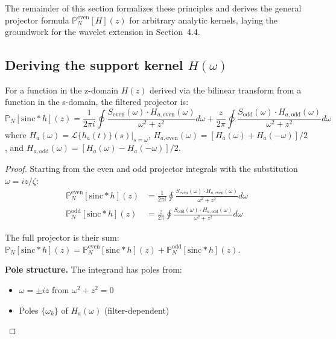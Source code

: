 The remainder of this section formalizes these principles and derives the general projector formula $\mathbb{P}_N^{\text{even}}[H](z)$ for arbitrary analytic kernels, laying the groundwork for the wavelet extension in Section~4.4.

\newcommand{\PP}{\mathbb{P}}
\newcommand{\odd}{\mathrm{odd}}
\newcommand{\even}{\mathrm{even}}

\subsection{Deriving the support kernel $\hat{H(\omega)}$}

\begin{theorem}
For a function in the z-domain $H(z)$ derived via the bilinear transform from a function in the s-domain, the filtered projector is:
\[
\mathbb{P}_N[\text{sinc} * h](z) = \frac{1}{2\pi i}\oint \frac{S_{\text{even}}(\omega) \cdot H_{a,\text{even}}(\omega)}{\omega^2+z^2} d\omega + \frac{z}{2\pi}\oint \frac{S_{\text{odd}}(\omega) \cdot H_{a,\text{odd}}(\omega)}{\omega^2+z^2} d\omega
\]
where $H_a(\omega) = \mathcal{L}\{h_a(t)\}(s)\big|_{s=\omega}$, $H_{a,\text{even}}(\omega) = [H_a(\omega) + H_a(-\omega)]/2$, and $H_{a,\text{odd}}(\omega) = [H_a(\omega) - H_a(-\omega)]/2$.

\begin{proof}
Starting from the even and odd projector integrals with the substitution $\omega = iz/\zeta$:
\begin{align*}
\mathbb{P}_N^{\text{even}}[\text{sinc} * h](z) &= \frac{1}{2\pi i}\oint \frac{S_{\text{even}}(\omega) \cdot H_{a,\text{even}}(\omega)}{\omega^2+z^2} d\omega\\
\mathbb{P}_N^{\text{odd}}[\text{sinc} * h](z) &= \frac{z}{2\pi}\oint \frac{S_{\text{odd}}(\omega) \cdot H_{a,\text{odd}}(\omega)}{\omega^2+z^2} d\omega
\end{align*}

The full projector is their sum: $\mathbb{P}_N[\text{sinc} * h](z) = \mathbb{P}_N^{\text{even}}[\text{sinc} * h](z) + \mathbb{P}_N^{\text{odd}}[\text{sinc} * h](z)$.

\textbf{Pole structure.} The integrand has poles from:
\begin{itemize}
\item $\omega = \pm iz$ from $\omega^2 + z^2 = 0$
\item Poles $\{\omega_k\}$ of $H_a(\omega)$ (filter-dependent)
\end{itemize}


\end{proof}
\end{theorem}
